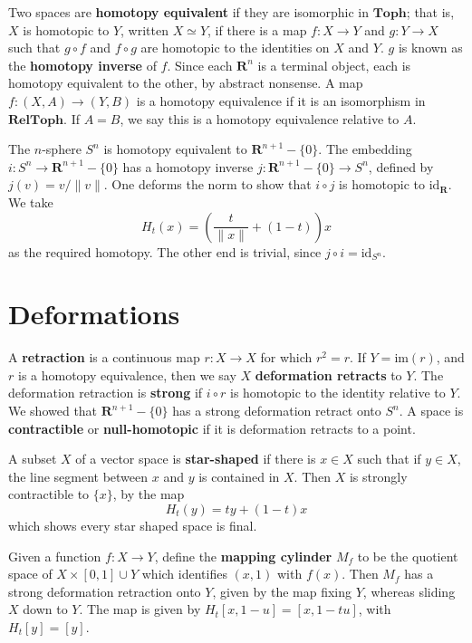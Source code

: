 Two spaces are {\bf homotopy equivalent} if they are isomorphic in $\textbf{Toph}$; that is, $X$ is homotopic to $Y$, written $X \simeq Y$, if there is a map $f:X \to Y$ and $g: Y \to X$ such that $g \circ f$ and $f \circ g$ are homotopic to the identities on $X$ and $Y$. $g$ is known as the {\bf homotopy inverse} of $f$. Since each $\mathbf{R}^n$ is a terminal object, each is homotopy equivalent to the other, by abstract nonsense. A map $f: (X,A) \to (Y,B)$ is a homotopy equivalence if it is an isomorphism in $\textbf{RelToph}$. If $A = B$, we say this is a homotopy equivalence relative to $A$.

\begin{example}
    The $n$-sphere $S^n$ is homotopy equivalent to $\mathbf{R}^{n+1} - \{ 0 \}$. The embedding $i: S^n \to \mathbf{R}^{n+1} - \{ 0 \}$ has a homotopy inverse $j: \mathbf{R}^{n+1} - \{ 0 \} \to S^n$, defined by $j(v) = v/\|v\|$. One deforms the norm to show that $i \circ j$ is homotopic to $\text{id}_{\mathbf{R}}$. We take
    \[ H_t(x) = \left( \frac{t}{\| x \|} + (1 - t) \right) x \]
    as the required homotopy. The other end is trivial, since $j \circ i = \text{id}_{S^n}$.
\end{example}

\section{Deformations}

A {\bf retraction} is a continuous map $r:X \to X$ for which $r^2 = r$. If $Y = \text{im}(r)$, and $r$ is a homotopy equivalence, then we say $X$ {\bf deformation retracts} to $Y$. The deformation retraction is {\bf strong} if $i \circ r$ is homotopic to the identity relative to $Y$. We showed that $\mathbf{R}^{n+1} - \{ 0 \}$ has a strong deformation retract onto $S^n$. A space is {\bf contractible} or {\bf null-homotopic} if it is deformation retracts to a point.

\begin{example}
    A subset $X$ of a vector space is {\bf star-shaped} if there is $x \in X$ such that if $y \in X$, the line segment between $x$ and $y$ is contained in $X$. Then $X$ is strongly contractible to $\{ x \}$, by the map
    \[ H_t(y) = ty + (1 - t)x \]
    which shows every star shaped space is final.
\end{example}

\begin{example}
    Given a function $f:X \to Y$, define the {\bf mapping cylinder} $M_f$ to be the quotient space of $X \times [0,1] \cup Y$ which identifies $(x,1)$ with $f(x)$. Then $M_f$ has a strong deformation retraction onto $Y$, given by the map fixing $Y$, whereas sliding $X$ down to $Y$. The map is given by $H_t[x,1-u] = [x,1-tu]$, with $H_t[y] = [y]$.
\end{example}

